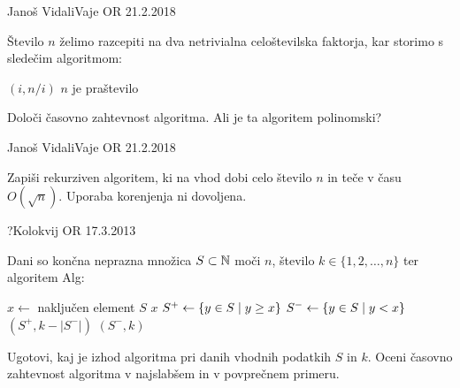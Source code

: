 \begin{naloga}{}{Janoš Vidali}{Vaje OR 21.2.2018}
\begin{vprasanje}
Število $n$ želimo razcepiti
na dva netrivialna celoštevilska faktorja,
kar storimo s sledečim algoritmom:
\begin{small}
\begin{algorithmic}
            \State \Return $(i, n/i)$
        \EndIf
    \EndFor
    \State \Return $n$ je praštevilo
\EndFunction
\end{algorithmic}
\end{small}
Določi časovno zahtevnost algoritma.
Ali je ta algoritem polinomski?

\end{vprasanje}
\begin{odgovor}
\end{odgovor}
\end{naloga}


\begin{naloga}{}{Janoš Vidali}{Vaje OR 21.2.2018}
\begin{vprasanje}
Zapiši rekurziven algoritem,
ki na vhod dobi celo število $n$ in teče v času $O(\sqrt{n})$.
Uporaba korenjenja ni dovoljena.

\end{vprasanje}
\begin{odgovor}
\end{odgovor}
\end{naloga}


\begin{naloga}{}{?}{Kolokvij OR 17.3.2013}
\begin{vprasanje}
Dani so končna neprazna množica $S \subset \mathbb{N}$ moči $n$,
število $k \in \{1, 2, \dots, n\}$ ter algoritem {\sc Alg}:
\begin{small}
\begin{algorithmic}
    \State $x \gets$ naključen element $S$
        \State \Return $x$
    \Else
        \State $S^+ \gets \left\{ y \in S \; \middle| \; y \ge x \right\}$
        \State $S^- \gets \left\{ y \in S \; \middle| \; y < x \right\}$
            \State {}$(S^+, k - |S^-|)$
        \Else
            \State {}$(S^-, k)$
        \EndIf
    \EndIf
\EndFunction
\end{algorithmic}
\end{small}
Ugotovi, kaj je izhod algoritma pri danih vhodnih podatkih $S$ in $k$.
Oceni časovno zahtevnost algoritma v najslabšem in v povprečnem primeru.
\end{vprasanje}
\begin{odgovor}
\end{odgovor}
\end{naloga}
